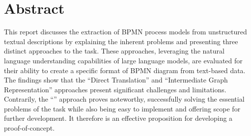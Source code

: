 \chapter*{Abstract}

This report discusses the extraction of BPMN process models from unstructured textual descriptions by explaining the inherent problems and presenting three distinct approaches to the task. These approaches, leveraging the natural language understanding capabilities of large language models, are evaluated for their ability to create a specific format of BPMN diagram from text-based data. The findings show that the ``Direct Translation'' and ``Intermediate Graph Representation'' approaches present significant challenges and limitations. Contrarily, the ``'' approach proves noteworthy, successfully solving the essential problems of the task while also being easy to implement and offering scope for further development. It therefore is an effective proposition for developing a proof-of-concept.